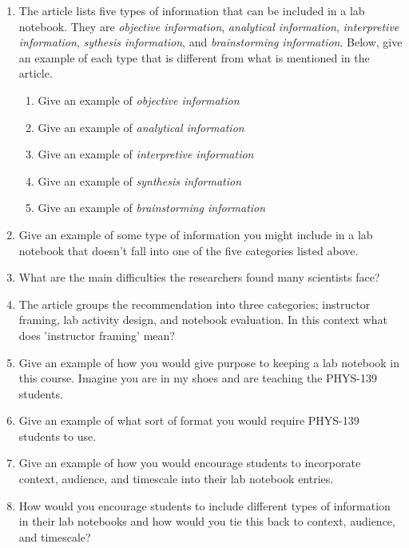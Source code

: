 \documentclass[12pt, letterpaper]{article}
\begin{document}
\begin{enumerate}
\item The article lists five types of information that can be included in a lab notebook.  They are \emph{objective information}, \emph{analytical information}, \emph{interpretive information}, \emph{sythesis information}, and \emph{brainstorming information}.  Below, give an example of each type that is different from what is mentioned in the article.

\begin{enumerate}
\item Give an example of \emph{objective information}

\item Give an example of \emph{analytical information}

\item Give an example of \emph{interpretive information}

\item Give an example of \emph{synthesis information}

\item Give an example of \emph{brainstorming information}

\end{enumerate}

\item Give an example of some type of information you might include in a lab notebook that doesn't fall into one of the five categories listed above.

\item What are the main difficulties the researchers found many scientists face?

\item The article groups the recommendation into three categories; instructor framing, lab activity design, and notebook evaluation.  In this context what does 'instructor framing' mean?

\item Give an example of how you would give purpose to keeping a lab notebook in this course.  Imagine you are in my shoes and are teaching the PHYS-139 students.

\item Give an example of what sort of format you would require PHYS-139 students to use.

\item Give an example of how you would encourage students to incorporate context, audience, and timescale into their lab notebook entries.

\item How would you encourage students to include different types of information in their lab notebooks and how would you tie this back to context, audience, and timescale?


\end{enumerate}
\end{document}
